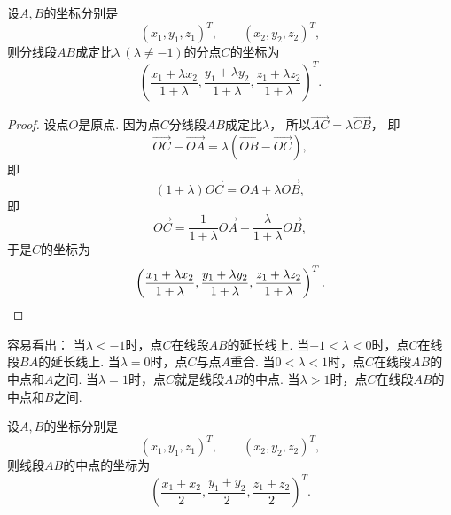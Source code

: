 \begin{theorem}\label{theorem:解析几何.空间两点的定比分点公式}
设\(A,B\)的坐标分别是\begin{equation*}
	(x_1,y_1,z_1)^T, \qquad
	(x_2,y_2,z_2)^T,
\end{equation*}
则分线段\(AB\)成定比\(\lambda\ (\lambda\neq-1)\)的分点\(C\)的坐标为\begin{equation}
	\left(
		\frac{x_1 + \lambda x_2}{1+\lambda},
		\frac{y_1 + \lambda y_2}{1+\lambda},
		\frac{z_1 + \lambda z_2}{1+\lambda}
	\right)^T.
\end{equation}
\begin{proof}
设点\(O\)是原点.
因为点\(C\)分线段\(AB\)成定比\(\lambda\)，
所以\(\vec{AC} = \lambda \vec{CB}\)，
即\begin{equation*}
	\vec{OC} - \vec{OA} = \lambda (\vec{OB} - \vec{OC}),
\end{equation*}
即\begin{equation*}
	(1+\lambda) \vec{OC} = \vec{OA} + \lambda \vec{OB},
\end{equation*}
即\begin{equation*}
	\vec{OC} = \frac{1}{1+\lambda} \vec{OA} + \frac{\lambda}{1+\lambda} \vec{OB},
\end{equation*}
于是\(C\)的坐标为\begin{equation*}
	\left(
		\frac{x_1 + \lambda x_2}{1+\lambda},
		\frac{y_1 + \lambda y_2}{1+\lambda},
		\frac{z_1 + \lambda z_2}{1+\lambda}
	\right)^T.
	\qedhere
\end{equation*}
\end{proof}
\end{theorem}
\begin{remark}
容易看出：
当\(\lambda<-1\)时，点\(C\)在线段\(AB\)的延长线上.
当\(-1<\lambda<0\)时，点\(C\)在线段\(BA\)的延长线上.
当\(\lambda=0\)时，点\(C\)与点\(A\)重合.
当\(0<\lambda<1\)时，点\(C\)在线段\(AB\)的中点和\(A\)之间.
当\(\lambda=1\)时，点\(C\)就是线段\(AB\)的中点.
当\(\lambda>1\)时，点\(C\)在线段\(AB\)的中点和\(B\)之间.
\end{remark}

\begin{corollary}
设\(A,B\)的坐标分别是\begin{equation*}
	(x_1,y_1,z_1)^T, \qquad
	(x_2,y_2,z_2)^T,
\end{equation*}
则线段\(AB\)的中点的坐标为
\begin{equation}
	\left(
		\frac{x_1 + x_2}{2},
		\frac{y_1 + y_2}{2},
		\frac{z_1 + z_2}{2}
	\right)^T.
\end{equation}
\end{corollary}


